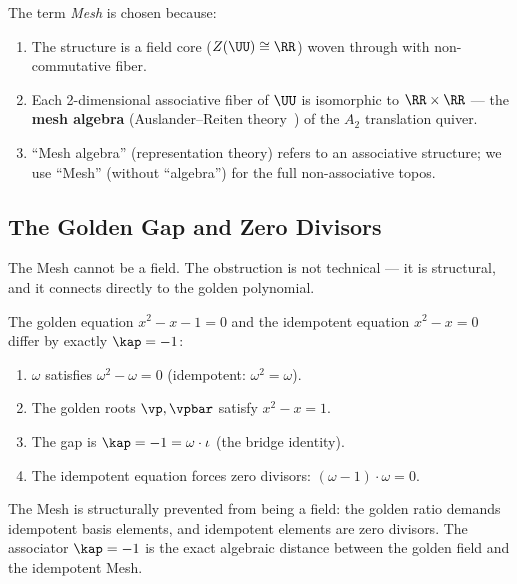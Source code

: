\begin{remark}
The term \emph{Mesh} is chosen because:
\begin{enumerate}[noitemsep]
\item The structure is a field core ($Z(\UU) \cong \RR$) woven through with non-commutative fiber.
\item Each 2-dimensional associative fiber of $\UU$ is isomorphic to $\RR \times \RR$ --- the \textbf{mesh algebra} (Auslander--Reiten theory~\cite{assem-simson-skowronski}) of the $A_2$ translation quiver.
\item ``Mesh algebra'' (representation theory) refers to an associative structure; we use ``Mesh'' (without ``algebra'') for the full non-associative topos.
\end{enumerate}
\end{remark}


\subsection{The Golden Gap and Zero Divisors}\label{sec:golden-gap}

The Mesh cannot be a field. The obstruction is not technical --- it is structural, and it connects directly to the golden polynomial.

\begin{theorem}{\label{thm:golden-gap}}
The golden equation $x^2 - x - 1 = 0$ and the idempotent equation $x^2 - x = 0$ differ by exactly $\kap = -1$:
\begin{enumerate}
\item $\omega$ satisfies $\omega^2 - \omega = 0$ (idempotent: $\omega^2 = \omega$).
\item The golden roots $\vp, \vpbar$ satisfy $x^2 - x = 1$.
\item The gap is $\kap = -1 = \omega \cdot \iota$ (the bridge identity).
\item The idempotent equation forces zero divisors: $(\omega - 1) \cdot \omega = 0$.
\end{enumerate}
The Mesh is structurally prevented from being a field: the golden ratio demands idempotent basis elements, and idempotent elements are zero divisors. The associator $\kap = -1$ is the exact algebraic distance between the golden field and the idempotent Mesh.
\end{theorem}

